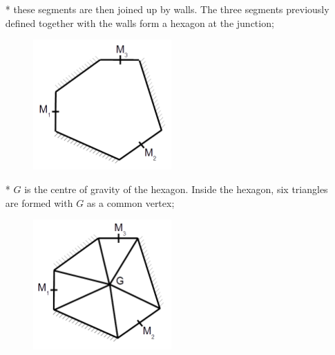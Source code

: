 \begin{itemize}
 \item[*] these segments are then joined up by walls. The three segments previously defined together with the walls form a hexagon at the junction;
   \begin{figure}[H]
    \begin{center}
     \includegraphics[width=0.5\textwidth]{Figures/cr3.png}
    \end{center}
  \end{figure}

 \item[*] $G$ is the centre of gravity of the hexagon. Inside the hexagon, six triangles are formed with $G$ as a common vertex;
  \begin{figure}[H]
    \begin{center}
     \includegraphics[width=0.5\textwidth]{Figures/cr4.png}
    \end{center}
  \end{figure}


\end{itemize}
